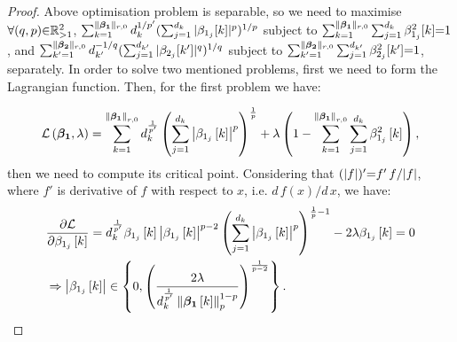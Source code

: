 \begin{proof}
Above optimisation problem is separable, so we need to maximise $\forall (q , p) {\in} \mathbb{R}^2_{{>} 1}$, $\sum_{k=1}^{\Vert\boldsymbol{\beta_1} \Vert_{r,0}} d_k^{1/p'}(\sum_{j=1}^{d_k} \vert \beta_{1_j} [k] \vert ^p)^{1/p}$ subject to $\sum_{k=1}^{\Vert\boldsymbol{\beta_1} \Vert_{r,0}} \sum_{j=1}^{d_k} \beta_{1_j}^2 [k] {=} 1$, 
and $\sum_{k'=1}^{\Vert\boldsymbol{\beta_2} \Vert_{r,0}} d_{k'}^{-1/q} (\sum_{j=1}^{d_{k'}} \vert \beta_{2_j}[k'] \vert ^q )^{1/q}$ subject to $\sum_{k'=1}^{\Vert\boldsymbol{\beta_2} \Vert_{r,0}} \sum_{j=1}^{d_{k'}} \beta_{2_j}^2 [k'] {=} 1$, 
separately.
In order to solve two mentioned problems, first we need to form the Lagrangian function.
Then, for the first problem we have:
\iffalse
\begin{gather*}
\mathcal{L} \myparanthese{\mybetao , \lambda} =
\displaystyle\sum_{k=1}^{\mynorm{\mybetao}_{r,0}} d_k^{\frac{1}{p'}} \myparanthese{\displaystyle\sum_{j=1}^{d_k} \beta_{1_j}^p \mybracket{k}}^\frac1p + \lambda \myparanthese{1 - \displaystyle\sum_{k=1}^{\mynorm{\mybetao}_{r,0}} \displaystyle\sum_{j=1}^{d_k} \beta_{1_j}^2 \mybracket{k}},
\end{gather*}
\fi
\begin{gather*}
\mathcal{L} \left( \boldsymbol{\beta_1} , \lambda \right) =
\displaystyle\sum_{k=1}^{\left\lVert\boldsymbol{\beta_1}\right\rVert_{r,0}} d_k^{\frac{1}{p'}} \left( \displaystyle\sum_{j=1}^{d_k} \left\lvert\beta_{1_j} \left[ k \right]\right\rvert ^p \right)^\frac1p + \lambda \left( 1 - \displaystyle\sum_{k=1}^{\left\lVert\boldsymbol{\beta_1}\right\rVert_{r,0}} \displaystyle\sum_{j=1}^{d_k} \beta_{1_j}^2 \left[ k \right] \right),
\end{gather*}
then we need to compute its critical point.
Considering that $(|f|)' {=} f' \, f / |f| $, where $f'$ is derivative of $f$ with respect to $x$, i.e. $d \, f(x) / d \, x$, we have:
\begin{gather*}
\begin{aligned}
& \frac{\partial \mathcal{L}}{\partial \beta_{1_j} \left[ k \right]} = 
d_k^{\frac{1}{p'}} \beta_{1_j} \left[ k \right] \left\lvert\beta_{1_j} \left[ k \right]\right\rvert^{p-2} \left( \displaystyle\sum_{j=1}^{d_k} \left\lvert\beta_{1_j} \left[ k \right]\right\rvert ^p \right)^{\frac1p - 1} - 
2 \lambda \beta_{1_j} \left[ k \right] = 0 \\
&\Rightarrow \left\lvert\beta_{1_j} \left[ k \right]\right\rvert \in
\left\lbrace 0 , \left( \frac{2 \lambda}{d_k^{\frac{1}{p'}}\left\lVert\boldsymbol{\beta_1} \left[ k \right]\right\rVert_p^{1-p}} \right)^{\frac{1}{p-2}} \right\rbrace.
\end{aligned}
\end{gather*}

\end{proof}
